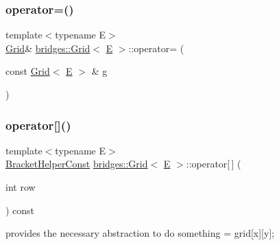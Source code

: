 \subsubsection{\texorpdfstring{operator=()}{operator=()}}
{\footnotesize\ttfamily template$<$typename E$>$ \\
\mbox{\hyperlink{classbridges_1_1_grid}{Grid}}\& \mbox{\hyperlink{classbridges_1_1_grid}{bridges\+::\+Grid}}$<$ \mbox{\hyperlink{namespacebridges_acfb0a4f7877d8f63de3e6862004c50eda3a3ea00cfc35332cedf6e5e9a32e94da}{E}} $>$\+::operator= (\begin{DoxyParamCaption}\item[{const \mbox{\hyperlink{classbridges_1_1_grid}{Grid}}$<$ \mbox{\hyperlink{namespacebridges_acfb0a4f7877d8f63de3e6862004c50eda3a3ea00cfc35332cedf6e5e9a32e94da}{E}} $>$ \&}]{g }\end{DoxyParamCaption})\hspace{0.3cm}{\ttfamily [inline]}}

\mbox{\label{classbridges_1_1_grid_ac49b7eb0ffe27d665b56655e2ef6fe7d}} 
\subsubsection{\texorpdfstring{operator[]()}{operator[]()}\hspace{0.1cm}{\footnotesize\ttfamily [1/2]}}
{\footnotesize\ttfamily template$<$typename E$>$ \\
\mbox{\hyperlink{classbridges_1_1_grid_1_1_bracket_helper_const}{Bracket\+Helper\+Const}} \mbox{\hyperlink{classbridges_1_1_grid}{bridges\+::\+Grid}}$<$ \mbox{\hyperlink{namespacebridges_acfb0a4f7877d8f63de3e6862004c50eda3a3ea00cfc35332cedf6e5e9a32e94da}{E}} $>$\+::operator\mbox{[}$\,$\mbox{]} (\begin{DoxyParamCaption}\item[{int}]{row }\end{DoxyParamCaption}) const\hspace{0.3cm}{\ttfamily [inline]}}



provides the necessary abstraction to do something = grid\mbox{[}x\mbox{]}\mbox{[}y\mbox{]}; 

\mbox{\label{classbridges_1_1_grid_ae7abc13b8aebe96372b05013a993c33b}} 
